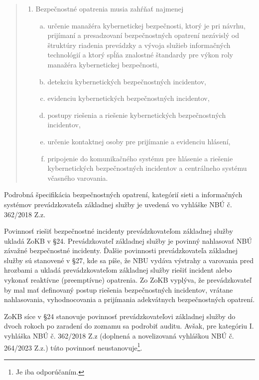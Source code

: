 \begin{quote}
\begin{enumerate}[(1)]
    \item Bezpečnostné opatrenia musia zahŕňať najmenej
      \begin{enumerate}[a)]
        \item určenie manažéra kybernetickej bezpečnosti, ktorý je pri návrhu, prijímaní a presadzovaní bezpečnostných opatrení
          nezávislý od štruktúry riadenia prevádzky a vývoja služieb informačných technológií a ktorý spĺňa znalostné štandardy
          pre výkon roly manažéra kybernetickej bezpečnosti,
        \item detekciu kybernetických bezpečnostných incidentov,
        \item evidenciu kybernetických bezpečnostných incidentov,
        \item postupy riešenia a riešenie kybernetických bezpečnostných incidentov,
        \item určenie kontaktnej osoby pre prijímanie a evidenciu hlásení,
        \item pripojenie do komunikačného systému pre hlásenie a riešenie kybernetických bezpečnostných incidentov a centrálneho
          systému včasného varovania.
      \end{enumerate}
  \end{enumerate}
\end{quote}
Podrobná špecifikácia bezpečnostných opatrení, kategórií sieti a informačných systémov prevádzkovateľa základnej služby
je uvedená vo vyhláške NBÚ č. 362/2018 Z.z.

Povinnosť riešiť bezpečnostné incidenty prevádzkovateľom základnej služby ukladá  \acrshort{ZoKB} v \S 24. Prevádzkovateľ
základnej služby je povinný nahlasovať NBÚ závažné bezpečnostné incidenty. Ďalšie povinnosti prevádzkovateľa základnej
služby sú stanovené v \S 27, kde sa píše, že \acrshort{NBU} vydáva výstrahy a varovania pred hrozbami a ukladá
prevádzkovateľom základnej služby riešiť incident alebo vykonať reaktívne (preemptívne) opatrenia. Zo ZoKB
vyplýva, že prevádzkovateľ by mal mať definovaný postup riešenia bezpečnostných incidentov, vrátane nahlasovania,
vyhodnocovania a prijímania adekvátnych bezpečnostných opatrení.

\acrshort{ZoKB} síce v \S 24 stanovuje povinnosť prevádzkovateľovi základnej služby do dvoch rokoch po zaradení do zoznamu
sa podrobiť auditu. Avšak, pre kategóriu I. vyhláška NBÚ č. 362/2018 Z.z (doplnená a novelizovaná vyhláškou NBÚ č. 264/2023 Z.z.)
túto povinnosť neustanovuje\footnote{Je iba odporúčaním.}.

